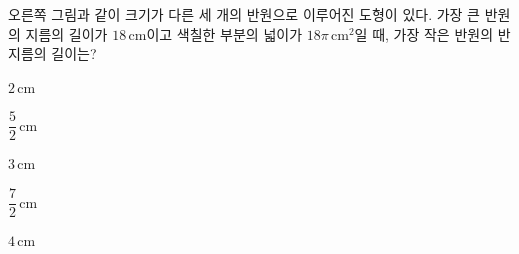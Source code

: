 \noindent\begin{minipage}[t]{0.58\linewidth}\vspace{0pt}\raggedright 오른쪽 그림과 같이 크기가 다른 세 개의 반원으로 이루어진 도형이 있다. 가장 큰 반원의 지름의 길이가 $18\,\mathrm{cm}$이고 색칠한 부분의 넓이가 $18\pi\,\mathrm{cm}^2$일 때, 가장 작은 반원의 반지름의 길이는?\end{minipage}\hfill\begin{minipage}[t]{0.4\linewidth}\vspace{0pt}\centering \resizebox{\ifdim\width>\linewidth\linewidth\else\width\fi}{!}{}\end{minipage}\par
\begin{choices32}{\rule[-3ex]{0pt}{8ex}$2\,\mathrm{cm}$}{\rule[-3ex]{0pt}{8ex}$\dfrac{5}{2}\,\mathrm{cm}$}{\rule[-3ex]{0pt}{8ex}$3\,\mathrm{cm}$}{\rule[-3ex]{0pt}{8ex}$\dfrac{7}{2}\,\mathrm{cm}$}{\rule[-3ex]{0pt}{8ex}$4\,\mathrm{cm}$}\end{choices32}
